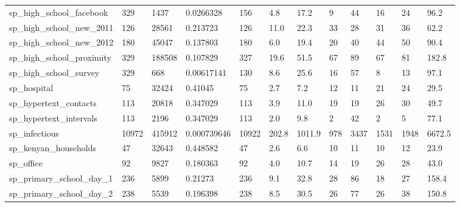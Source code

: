 \begin{longtable}{llllllllllll}
 sp\_high\_school\_facebook                            & 329        & 1437      & 0.0266328   & 156   & 4.8    & 17.2   & 9     & 44     & 16     & 24     & 96.2    \\
 sp\_high\_school\_new\_2011                            & 126        & 28561     & 0.213723    & 126   & 11.0   & 22.3   & 33    & 28     & 31     & 36     & 62.2    \\
 sp\_high\_school\_new\_2012                            & 180        & 45047     & 0.137803    & 180   & 6.0    & 19.4   & 20    & 40     & 44     & 50     & 90.4    \\
 sp\_high\_school\_proximity                           & 329        & 188508    & 0.107829    & 327   & 19.6   & 51.5   & 67    & 89     & 67     & 81     & 182.8   \\
 sp\_high\_school\_survey                              & 329        & 668       & 0.00617141  & 130   & 8.6    & 25.6   & 16    & 57     & 8      & 13     & 97.1    \\
 sp\_hospital                                        & 75         & 32424     & 0.41045     & 75    & 2.7    & 7.2    & 12    & 11     & 21     & 24     & 29.5    \\
 sp\_hypertext\_contacts                              & 113        & 20818     & 0.347029    & 113   & 3.9    & 11.0   & 19    & 19     & 26     & 30     & 49.7    \\
 sp\_hypertext\_intervals                             & 113        & 2196      & 0.347029    & 113   & 2.0    & 9.8    & 2     & 42     & 2      & 5      & 77.1    \\
 sp\_infectious                                      & 10972      & 415912    & 0.000739646 & 10922 & 202.8  & 1011.9 & 978   & 3437   & 1531   & 1948   & 6672.5  \\
 sp\_kenyan\_households                               & 47         & 32643     & 0.448582    & 47    & 2.6    & 6.6    & 10    & 11     & 10     & 12     & 23.9    \\
 sp\_office                                          & 92         & 9827      & 0.180363    & 92    & 4.0    & 10.7   & 14    & 19     & 26     & 28     & 43.0    \\
 sp\_primary\_school\_day\_1                            & 236        & 5899      & 0.21273     & 236   & 9.1    & 32.8   & 28    & 86     & 18     & 27     & 158.4   \\
 sp\_primary\_school\_day\_2                            & 238        & 5539      & 0.196398    & 238   & 8.5    & 30.5   & 26    & 77     & 26     & 38     & 150.8   \\

\end{longtable}
